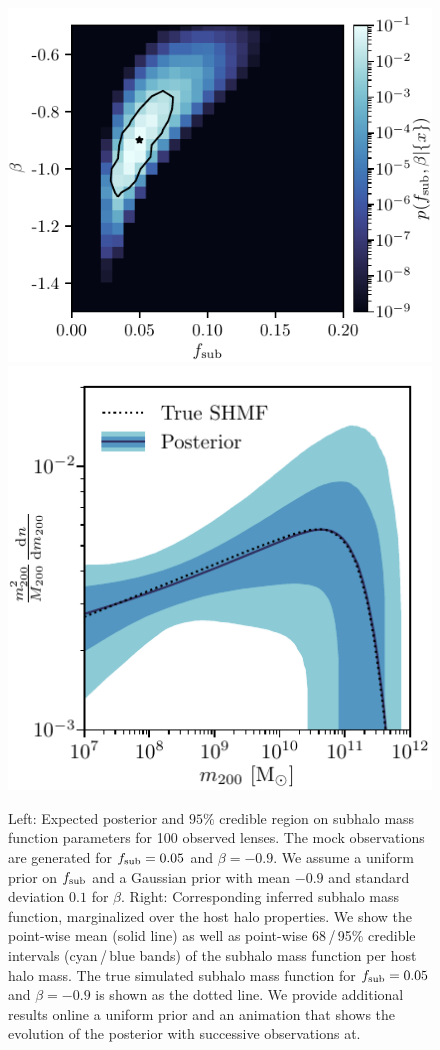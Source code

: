 \documentclass[twocolumn]{aastex63}
\begin{document}
\begin{figure}[t!]
\centering
\includegraphics[height=0.4\textwidth]{figures/posterior}%
\hspace*{0.075\textwidth}%
\includegraphics[height=0.4\textwidth]{figures/shmf}%
\hspace*{0.052\textwidth}%
\caption{Left: Expected posterior and $95\%$ credible region on subhalo mass function parameters for 100 observed lenses. The mock observations are generated for $f_{\mathrm{sub}} = 0.05$ and $\beta = -0.9$. We assume a uniform prior on $f_{\mathrm{sub}}$ and a Gaussian prior with mean $-0.9$ and standard deviation $0.1$ for $\beta$.  Right: Corresponding inferred subhalo mass function, marginalized over the host halo properties. We show the point-wise mean (solid line) as well as point-wise 68\,/\,95\% credible intervals (cyan\,/\,blue bands) of the subhalo mass function per host halo mass. The true simulated subhalo mass function for $f_{\mathrm{sub}} = 0.05$ and $\beta = -0.9$ is shown as the dotted line. We provide additional results online a uniform prior and an animation that shows the evolution of the posterior with successive observations at.  }
\label{fig:bayesian_post}
\end{figure}
\end{document}
